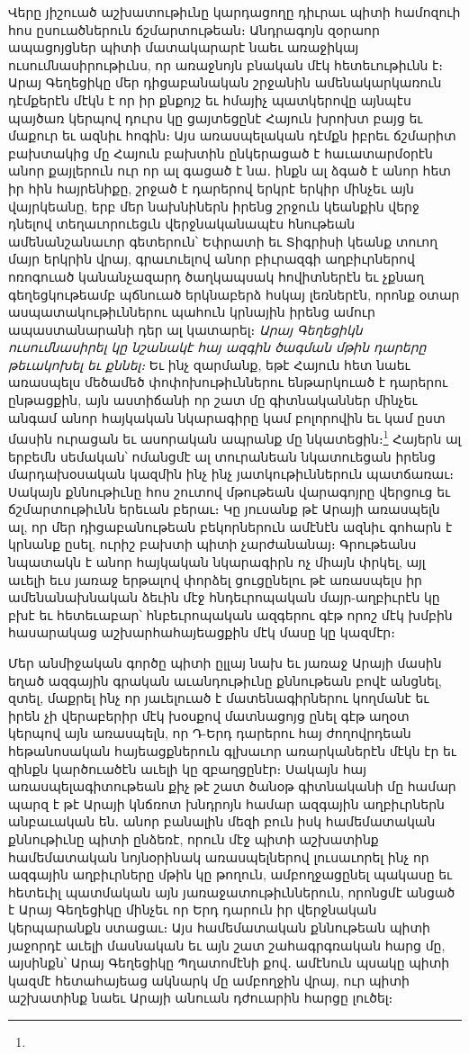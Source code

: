 \documentclass{article}
\begin{document}
{Վերը յիշուած աշխատութիւնը կարդացողը դիւրաւ պիտի համոզուի հոս ըսուածներուն ճշմարտութեան։ Անդրագոյն զօրաոր ապացոյցներ պիտի մատակարարէ նաեւ առաջիկայ ուսումնասիրութիւնս, որ առաջնոյն բնական մէկ հետեւութիւնն է։ Արայ Գեղեցիկը մեր դիցաբանական շրջանին ամենակարկառուն դէմքերէն մէկն է որ իր քնքոյշ եւ հմայիչ պատկերովը այնպէս պայծառ կերպով դուրս կը ցայտեցընէ Հայուն խրոխտ բայց եւ մաքուր եւ ազնիւ հոգին։ Այս առասպելական դէմքն իբրեւ ճշմարիտ բախտակից մը Հայուն բախտին ընկերացած է հաւատարմօրէն անոր քայլերուն ուր որ ալ գացած է նա․ ինքն ալ ձգած է անոր հետ իր հին հայրենիքը, շրջած է դարերով երկրէ երկիր մինչեւ այն վայրկեանը, երբ մեր նախնիներն իրենց շրջուն կեանքին վերջ դնելով տեղաւորուեցւն վերջնականապէս հնութեան ամենանշանաւոր գետերուն՝ Եփրատի եւ Տիգրիսի կեանք տուող մայր երկրին վրայ, գրաւուելով անոր բիւրազգի աղբիւրներով ոռոգուած կանանչազարդ ծաղկապսակ հովիտներէն եւ չքնաղ գեղեցկութեամբ պճնուած երկնաբերձ հսկայ լեռներէն, որոնք օտար ասպատակութիւններու պահուն կրնային իրենց ամուր ապաստանարանի դեր ալ կատարել։ \emph{Արայ Գեղեցիկն ուսումնասիրել կը նշանակէ հայ ազգին ծագման մթին դարերը թեւակոխել եւ քննել։} Եւ ինչ զարմանք, եթէ Հայուն հետ նաեւ առասպելս մեծամեծ փոփոխութիւններու ենթարկուած է դարերու ընթացքին, այն աստիճանի որ շատ մը գիտնականներ մինչեւ անգամ անոր հայկական նկարագիրը կամ բոլորովին եւ կամ ըստ մասին ուրացան եւ ասորական ապրանք մը նկատեցին։\footnote{} Հայերն ալ երբեմն սեմական՝ ոմանցմէ ալ տուրանեան նկատուեցան իրենց մարդախօսական կազմին ինչ ինչ յատկութիւններուն պատճառաւ։ Սակայն քննութիւնը հոս շուտով մթութեան վարագոյրը վերցուց եւ ճշմարտութիւնն երեւան բերաւ։ Կը յուսանք թէ Արայի առասպելն ալ, որ մեր դիցաբանութեան բեկորներուն ամէնէն ազնիւ գոհարն է կրնանք ըսել, ուրիշ բախտի պիտի չարժանանայ։ Գրութեանս նպատակն է անոր հայկական նկարագիրն ոչ միայն փրկել, այլ աւելի եւս յառաջ երթալով փորձել ցուցընելու թէ առասպելս իր ամենանախնական ձեւին մէջ հնդեւրոպական մայր-աղբիւրէն կը բխէ եւ հետեւաբար՝ հնբեւրոպական ազգերու գէթ որոշ մէկ խմբին հասարակաց աշխարհահայեացքին մէկ մասը կը կազմէր։

Մեր անմիջական գործը պիտի ըլլայ նախ եւ յառաջ Արայի մասին եղած ազգային գրական աւանդութիւնը քննութեան բովէ անցնել, զտել, մաքրել ինչ որ յաւելուած է մատենագիրներու կողմանէ եւ իրեն չի վերաբերիր մէկ խօսքով մատնացոյց ընել գէթ աղօտ կերպով այն առասպելն, որ Դ-Երդ դարերու հայ ժողովրդեան հեթանոսական հայեացքներուն գլխաւոր առարկաներէն մէկն էր եւ զինքն կարծուածէն աւելի կը զբաղցընէր։ Սակայն հայ առասպելագիտութեան քիչ թէ շատ ծանօթ գիտնականի մը համար պարզ է թէ Արայի կնճռոտ խնդրոյն համար ազգային աղբիւրներն անբաւական են․ անոր բանալին մեզի բուն իսկ համեմատական քննութիւնը պիտի ընձեռէ, որուն մէջ պիտի աշխատինք համեմատական նոյնօրինակ առասպելներով լուսաւորել ինչ որ ազգային աղբիւրները մթին կը թողուն, ամբողջացընել պակասը եւ հետեւիլ պատմական այն յառաջատութիւններուն, որոնցմէ անցած է Արայ Գեղեցիկը մինչեւ որ Երդ դարուն իր վերջնական կերպարանքն ստացաւ։ Այս համեմատական քննութեան պիտի յաջորդէ աւելի մասնական եւ այն շատ շահագրգռական հարց մը, այսինքն՝ Արայ Գեղեցիկը Պղատոմէնի քով․ ամէնուն պսակը պիտի կազմէ հետահայեաց ակնարկ մը ամբողջին վրայ, ուր պիտի աշխատինք նաեւ Արայի անուան դժուարին հարցը լուծել։
}
\clearpage
\end{document}
